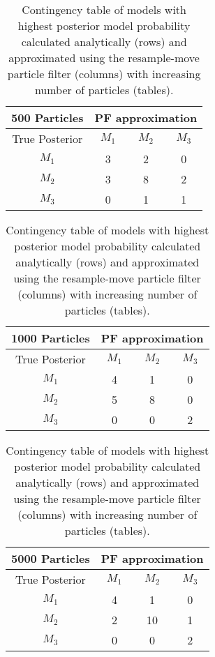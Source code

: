 \documentclass{article}
\begin{document}
\begin{table}[h]
\centering
\caption{Contingency table of models with highest posterior model probability calculated analytically (rows) and approximated using the resample-move particle filter (columns) with increasing number of particles (tables).} \label{tab:cont}
\begin{tabular}{|c|c|c|c|}
  \hline
{\bf 500 Particles} & \multicolumn{3}{|c|}{PF approximation} \\
 \hline
 True Posterior & $M_1$& $M_2$ & $M_3$ \\
  \hline
$M_1$ &   3 &   2 &   0 \\
\hline
$M_2$ &   3 &   8 &   2 \\
\hline
$M_3$ &   0 &   1 &   1 \\
   \hline
\end{tabular}
\quad
\begin{tabular}{|c|c|c|c|}
  \hline
{\bf 1000 Particles} & \multicolumn{3}{|c|}{PF approximation} \\
 \hline
 True Posterior & $M_1$& $M_2$ & $M_3$ \\
  \hline
$M_1$ &   4 &   1 &   0 \\
\hline
  $M_2$ &   5 &   8 &   0 \\
  \hline
  $M_3$ &   0 &   0 &   2 \\
   \hline
\end{tabular}
\quad
\begin{tabular}{|c|c|c|c|}
  \hline
{\bf 5000 Particles} & \multicolumn{3}{|c|}{PF approximation} \\
 \hline
 True Posterior & $M_1$& $M_2$ & $M_3$ \\
  \hline
$M_1$ &   4 &   1 &   0 \\
  \hline
  $M_2$ &   2 &   10 &   1 \\
  \hline
  $M_3$ &   0 &   0 &   2 \\
   \hline
\end{tabular}
\end{table}
\end{document}
